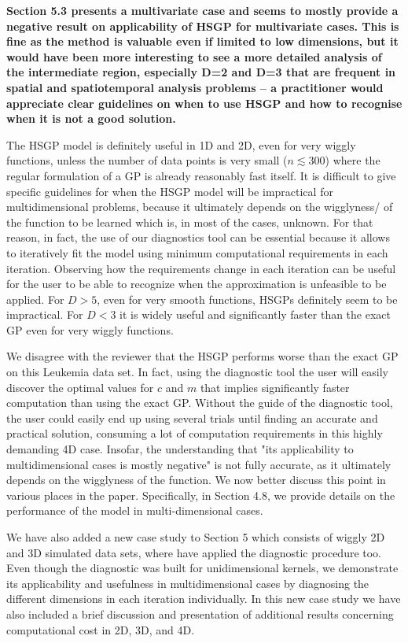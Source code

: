 \documentclass[11pt]{report}
\begin{document}
\textbf{Section 5.3 presents a multivariate case and seems to mostly provide a negative result on applicability of HSGP for multivariate cases. This is fine as the method is valuable even if limited to low dimensions, but it would have been more interesting to see a more detailed analysis of the intermediate region, especially D=2 and D=3 that are frequent in spatial and spatiotemporal analysis problems -- a practitioner would appreciate clear guidelines on when to use HSGP and how to recognise when it is not a good solution.}

The HSGP model is definitely useful in 1D and 2D, even for very wiggly functions, unless the number of data points is very small ($n \lesssim 300$) where the regular formulation of a GP is already reasonably fast itself.
It is difficult to give specific guidelines for when the HSGP model will be impractical for multidimensional problems, because it ultimately depends on the wigglyness/ of the function to be learned which is, in most of the cases, unknown. For that reason, in fact, the use of our diagnostics tool can be essential because it allows to iteratively fit the model using minimum computational requirements in each iteration. Observing how the requirements change in each iteration can be useful for the user to be able to recognize when the approximation is unfeasible to be applied. For $D>5$, even for very smooth functions, HSGPs definitely seem to be impractical. For $D<3$ it is widely useful and significantly faster than the exact GP even for very wiggly functions.

We disagree with the reviewer that the HSGP performs worse than the exact GP on this Leukemia data set. In fact, using the diagnostic tool the user will easily discover the optimal values for $c$ and $m$ that implies significantly faster computation than using the exact GP. Without the guide of the diagnostic tool, the user could easily end up using several trials until finding an accurate and practical solution, consuming a lot of computation requirements in this highly demanding 4D case. Insofar, the understanding that "its applicability to multidimensional cases is mostly negative" is not fully accurate, as it ultimately depends on the wigglyness of the function. We now better discuss this point in various places in the paper. Specifically, in Section 4.8, we provide details on the performance of the model in multi-dimensional cases. 


We have also added a new case study to Section 5 which consists of wiggly 2D and 3D simulated data sets, where have applied the diagnostic procedure too. Even though the diagnostic was built for unidimensional kernels, we demonstrate its applicability and usefulness in multidimensional cases by diagnosing the different dimensions in each iteration individually. 
In this new case study we have also included a brief discussion and presentation of additional results concerning computational cost in 2D, 3D, and 4D. 
\end{document}
